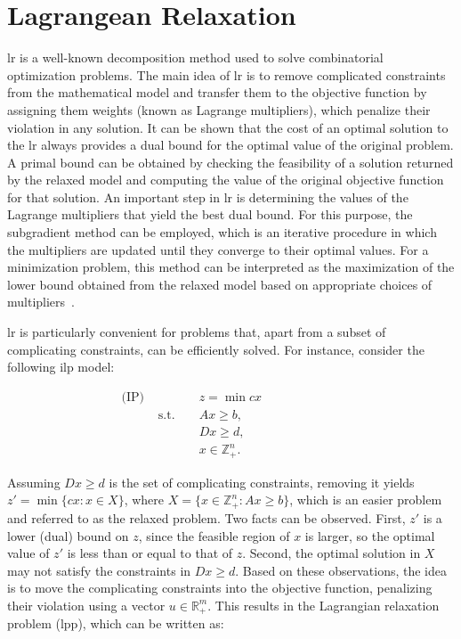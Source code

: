 \section{Lagrangean Relaxation}\label{sec:cbrp-lagrangean-relaxation}

\gls{lr} is a well-known decomposition method used to solve combinatorial
optimization problems. The main idea of \gls{lr} is to remove complicated
constraints from the mathematical model and transfer them to the objective
function by assigning them weights (known as Lagrange multipliers), which
penalize their violation in any solution. It can be shown that the cost of an
optimal solution to the \gls{lr} always provides a dual bound for the optimal
value of the original problem. A primal bound can be obtained by checking the
feasibility of a solution returned by the relaxed model and computing the value
of the original objective function for that solution. An important step in
\gls{lr} is determining the values of the Lagrange multipliers that yield the
best dual bound. For this purpose, the subgradient method can be employed, which
is an iterative procedure in which the multipliers are updated until they
converge to their optimal values. For a minimization problem, this method can be
interpreted as the maximization of the lower bound obtained from the relaxed
model based on appropriate choices of multipliers~\cite{Beasley:1993}.

\gls{lr} is particularly convenient for problems that, apart from a subset of
complicating constraints, can be efficiently solved. For instance, consider the
following \gls{ilp} model:

\begin{align*}
	\text{(IP) } &              &  & z = \min cx           &  &  &  &  &  &  &  & \\
	             & \text{s.t. } &  & Ax \geq b,            &  &  &  &  &  &  &  & \\
	             &              &  & Dx \geq d,            &  &  &  &  &  &  &  & \\
	             &              &  & x \in \mathbb{Z}^n_+. &  &  &  &  &  &  &  &
\end{align*}

Assuming $Dx \geq d$ is the set of complicating constraints, removing it yields
$z' = \min \{cx : x \in X\}$, where $X = \{x \in \mathbb{Z}^n_+ : Ax \geq b\}$,
which is an easier problem and referred to as the relaxed problem. Two facts can
be observed. First, $z'$ is a lower (dual) bound on $z$, since the feasible
region of $x$ is larger, so the optimal value of $z'$ is less than or equal to
that of $z$. Second, the optimal solution in $X$ may not satisfy the constraints
in $Dx \geq d$. Based on these observations, the idea is to move the
complicating constraints into the objective function, penalizing their violation
using a vector $u \in \mathbb{R}^{m}_+$. This results in the Lagrangian
relaxation problem (\gls{lpp}), which can be written as:


